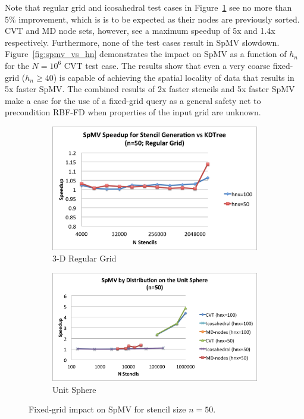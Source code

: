 \documentclass{report}
\begin{document}
Note that regular grid and icosahedral test cases in Figure~\ref{fig:spmv_impact_rg} see no more than 5\% improvement, which is is to be expected as their nodes are previously sorted. CVT and MD node sets, however, see a maximum speedup of 5x and 1.4x respectively. Furthermore, none of the test cases result in SpMV slowdown. Figure~\ref{fig:spmv_vs_hn} demonstrates the impact on SpMV as a function of $h_n$ for the $N=10^6$ CVT test case. The results show that even a very coarse fixed-grid ($h_n \ge 40$) is capable of achieving the spatial locality of data that results in 5x faster SpMV. The combined results of 2x faster stencils and 5x faster SpMV make a case for the use of a fixed-grid query as a general safety net to precondition RBF-FD when properties of the input grid are unknown. 

\begin{figure}
\centering
\begin{subfigure}{9.5cm}
\includegraphics[width=\textwidth]{../figures/stencils/reg_subsets_4m_spmv_speedup.png}
\caption{3-D Regular Grid}
\end{subfigure}
\begin{subfigure}{10.5cm}
\includegraphics[width=\textwidth]{../figures/stencils/sphere_spmv_speedup.png} 
\caption{Unit Sphere}
\end{subfigure}
\caption{Fixed-grid impact on SpMV for stencil size $n=50$.}
\label{fig:spmv_impact_rg}
\end{figure}
\end{document}
